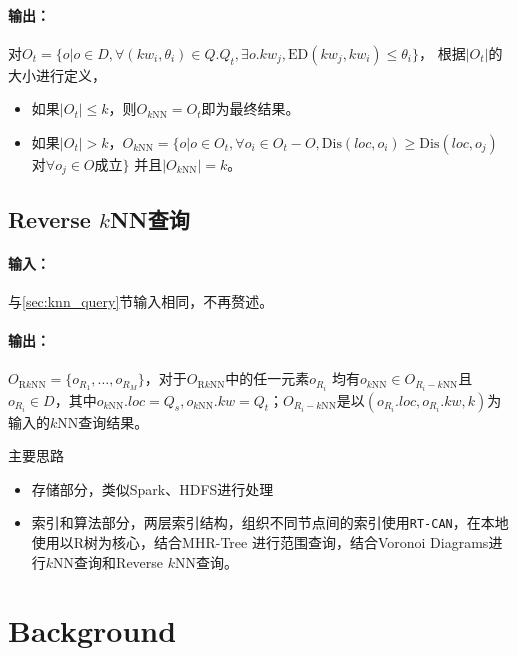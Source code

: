 \documentclass{ML}
\begin{document}
\paragraph{输出：}对$O_t = \{o | o \in D, \forall(kw_i, \theta_i) \in Q.Q_t, \exists o.kw_j, \mathrm{ED}(kw_j, kw_i) \leq \theta_i\}$，
根据$|O_t|$的大小进行定义，
\begin{itemize}
    \item 如果$|O_t| \leq k$，则$O_{k\mathrm{NN}} = O_t$即为最终结果。
    \item 如果$|O_t| > k$，$O_{k\mathrm{NN}}= \{o | o \in O_t, \forall o_i \in O_t - O, \mathrm{Dis}(loc, o_i) \ge \mathrm{Dis}(loc, o_j)$对$\forall o_j \in O$成立$\}$
    并且$|O_{k\mathrm{NN}}| = k$。
\end{itemize}

\subsection{Reverse $k$NN查询}\label{sec:RkNN-query}
\paragraph{输入：}与\ref{sec:knn_query}节输入相同，不再赘述。
\paragraph{输出：}$O_{\mathrm{R}k\mathrm{NN}} = \{o_{R_1}, \dots, o_{R_M}\}$，对于$O_{\mathrm{R}k\mathrm{NN}}$中的任一元素$o_{R_i}$
均有$o_{k\mathrm{NN}} \in O_{R_i-k\mathrm{NN}}$且$o_{R_i} \in D$，其中$o_{k\mathrm{NN}}.loc = Q_s, o_{k\mathrm{NN}}.kw = Q_t$；$O_{R_i-k\mathrm{NN}}$是以$(o_{R_i}.loc, o_{R_i}.kw, k)$为输入的$k$NN查询结果。

\newpage
主要思路\begin{itemize}
    \item 存储部分，类似Spark、HDFS进行处理
    \item 索引和算法部分，两层索引结构，组织不同节点间的索引使用\texttt{RT-CAN}\cite{RT-CAN}，在本地使用以R树为核心，结合MHR-Tree\cite{MHR-Tree}
    进行范围查询，结合Voronoi Diagrams\cite{VoR-Tree}进行$k$NN查询和Reverse $k$NN查询。
\end{itemize}

\section{Background}
\end{document}
